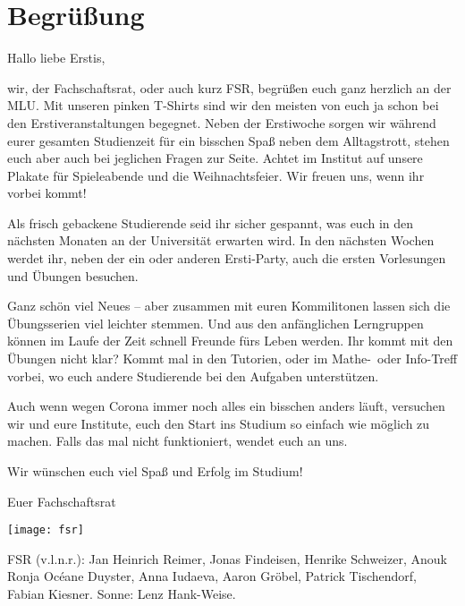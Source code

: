 \section{Begrüßung}

\begin{spacing}{1.5}
    \setlength{\parskip}{1.6ex}

    Hallo liebe Erstis,

    wir, der Fachschaftsrat, oder auch kurz FSR, 
    begrüßen euch ganz herzlich an der MLU.
    Mit unseren pinken T-Shirts sind wir den meisten 
    von euch ja schon bei den Erstiveranstaltungen begegnet.
    Neben der Erstiwoche sorgen wir während eurer gesamten Studienzeit
    für ein bisschen Spaß neben dem Alltagstrott, 
    stehen euch aber auch bei jeglichen Fragen zur Seite.
    Achtet im Institut auf unsere Plakate für Spieleabende und die Weihnachtsfeier.
    Wir freuen uns, wenn ihr vorbei kommt!

    Als frisch gebackene Studierende seid ihr sicher gespannt, 
    was euch in den nächsten Monaten 
    an der Universität erwarten wird. 
    In den nächsten Wochen werdet ihr, 
    neben der ein oder anderen Ersti-Party,
    auch die ersten Vorlesungen und Übungen besuchen.

    Ganz schön viel Neues -- 
    aber zusammen mit euren Kommilitonen 
    lassen sich die Übungsserien viel leichter stemmen.
    Und aus den anfänglichen Lerngruppen 
    können im Laufe der Zeit schnell Freunde fürs Leben werden.
    Ihr kommt mit den Übungen nicht klar? 
    Kommt mal in den Tutorien, 
    oder im Mathe-~oder Info-Treff vorbei, 
    wo euch andere Studierende bei den Aufgaben unterstützen.

    Auch wenn wegen Corona immer noch alles ein bisschen anders läuft,
    versuchen wir und eure Institute, euch den Start ins Studium 
    so einfach wie möglich zu machen. Falls das mal nicht funktioniert, wendet euch an uns.

    Wir wünschen euch viel Spaß und Erfolg im Studium!

    Euer Fachschaftsrat \\
\end{spacing}
\vspace*{-1ex}
\begin{center}
    \texttt{[image: fsr]}
\end{center}%
FSR (v.l.n.r.): 
Jan Heinrich Reimer,
Jonas Findeisen,
Henrike Schweizer,
Anouk Ronja Océane Duyster,
Anna Iudaeva,
Aaron Gröbel, 
Patrick Tischendorf,
Fabian Kiesner.
Sonne:
Lenz Hank-Weise.

